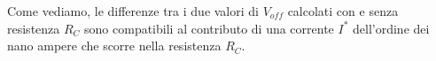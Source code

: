 Come vediamo, le differenze tra i due valori di $V_{off}$ calcolati con e senza resistenza $R_C$ sono compatibili al contributo di una corrente $I^*$ dell'ordine dei nano ampere che scorre nella resistenza $R_C$.

















































































